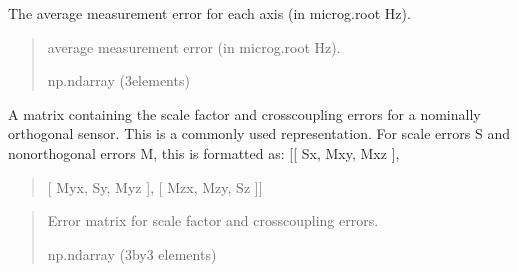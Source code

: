 \documentclass[letterpaper,10pt,english]{sphinxmanual}
\begin{document}
\begin{fulllineitems}
\begin{fulllineitems}
\label{\detokenize{modules/measurement/error_properties:qnav.measurement.error_properties.ErrorProperties.avg_meas_noise}}
\pysigstartsignatures
{}
\pysigstopsignatures
\sphinxAtStartPar
The average measurement error for each axis (in micro\sphinxhyphen{}g.root Hz).
\begin{quote}\begin{description}
\sphinxAtStartPar
average measurement error (in micro\sphinxhyphen{}g.root Hz).

\sphinxAtStartPar
np.ndarray (3\sphinxhyphen{}elements)

\end{description}\end{quote}

\end{fulllineitems}


\begin{fulllineitems}
\label{\detokenize{modules/measurement/error_properties:qnav.measurement.error_properties.ErrorProperties.error_matrix}}
\pysigstartsignatures
{}
\pysigstopsignatures
\sphinxAtStartPar
A matrix containing the scale factor and cross\sphinxhyphen{}coupling errors for a
nominally orthogonal sensor. This is a commonly used representation.
For scale errors S and non\sphinxhyphen{}orthogonal errors M, this is formatted as:
{[}{[} Sx, Mxy, Mxz {]},
\begin{quote}

\sphinxAtStartPar
{[} Myx, Sy, Myz {]},
{[} Mzx, Mzy, Sz {]}{]}
\end{quote}
\begin{quote}\begin{description}
\sphinxAtStartPar
Error matrix for scale factor and cross\sphinxhyphen{}coupling errors.

\sphinxAtStartPar
np.ndarray (3\sphinxhyphen{}by\sphinxhyphen{}3 elements)

\end{description}\end{quote}

\end{fulllineitems}


\end{fulllineitems}
\end{document}
